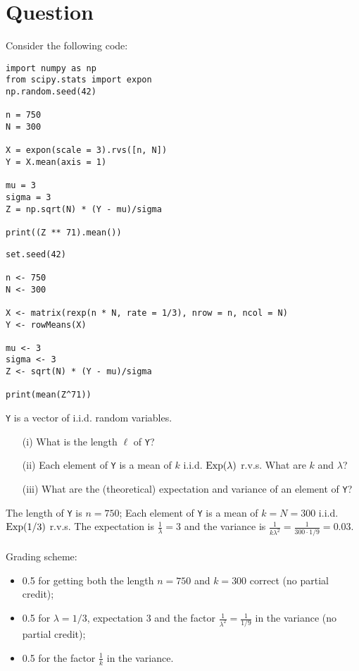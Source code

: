 \section*{Question}

Consider the following code:

\begin{verbatim}
import numpy as np
from scipy.stats import expon
np.random.seed(42)

n = 750
N = 300

X = expon(scale = 3).rvs([n, N])
Y = X.mean(axis = 1)

mu = 3
sigma = 3
Z = np.sqrt(N) * (Y - mu)/sigma

print((Z ** 71).mean())
\end{verbatim}

\begin{verbatim}
set.seed(42)

n <- 750
N <- 300

X <- matrix(rexp(n * N, rate = 1/3), nrow = n, ncol = N)
Y <- rowMeans(X)

mu <- 3
sigma <- 3
Z <- sqrt(N) * (Y - mu)/sigma

print(mean(Z^71))
\end{verbatim}

\vspace*{20pt}


\begin{exercise}[1.5]
\texttt{Y} is a vector of i.i.d. random variables.

\begin{itemize}
\item[(i)] What is the length $\ell$ of \texttt{Y}?
\item[(ii)] Each element of \texttt{Y} is a mean of $k$ i.i.d. $\mathrm{Exp}(\lambda)$ r.v.s.
What are $k$ and $\lambda$?  
\item[(iii)] What are the (theoretical) expectation and variance of an element of \texttt{Y}? 
\end{itemize} 

\begin{solution}
The length of \texttt{Y} is $n = 750$;  Each element of \texttt{Y} is a mean of $k = N = 300$ i.i.d. $\mathrm{Exp}(1/3)$ r.v.s.
The expectation is $\frac1\lambda = 3$ and the variance is $\frac1{k \lambda^2} = \frac1{300\cdot1/9} = 0.03$. \\ \\
Grading scheme:
\begin{itemize}
\item 0.5 for getting both the length $n=750$ and  $k=300$ correct (no partial credit);
\item 0.5 for $\lambda = 1/3$, expectation $3$ and the factor $\frac1{\lambda^2} = \frac{1}{1/9}$ in the variance (no partial credit);
\item 0.5 for the factor $\frac1{k}$ in the variance.
\end{itemize}
\end{solution}
\end{exercise}

